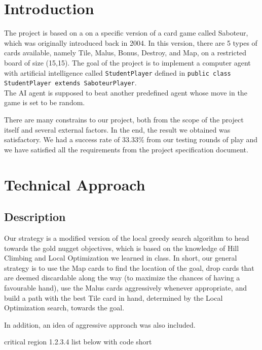 \documentclass[12pt,twoside,letterpaper]{article}
\begin{document}

\tableofcontents
\newpage
\newpage

\section{Introduction}
The project is based on a on a specific version of a card game called Saboteur, which was originally introduced back in 2004. In this version, there are 5 types of cards available, namely Tile, Malus, Bonus, Destroy, and Map, on a  restricted board of size (15,15). The goal of the project is to implement a computer agent with artificial intelligence called \texttt{StudentPlayer} defined in \texttt{public class StudentPlayer extends SaboteurPlayer}. \\ The AI agent is supposed to beat another predefined agent whose move in the game is set to be random.
\par There are many constrains to our project, both from the scope of the project itself and several external factors. In the end, the result we obtained was satisfactory. We had a success rate of 33.33\% from our testing rounds of play and we have satisfied all the requirements from the project specification document.

\section{Technical Approach}
\subsection{Description}
Our strategy is a modified version of the local greedy search algorithm to head towards the gold nugget objectives, which is based on the knowledge of Hill Climbing and Local Optimization we learned in class. In short, our general strategy is to use the Map cards to find the location of the goal, drop cards that are deemed discardable along the way (to maximize the chances of having a favourable hand), use the Malus cards aggressively whenever appropriate, and build a path with the best Tile card in hand, determined by the Local Optimization search, towards the goal.
\par In addition, an idea of aggressive approach was also included.
\par critical region
1.2.3.4 list below with code short
\end{document}
